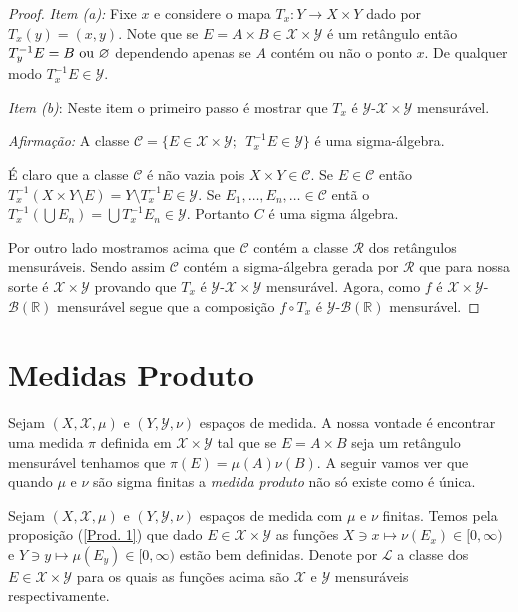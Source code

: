 \begin{proof}
 \emph{Item (a):} Fixe $x$ e considere o mapa $T_x:Y\to X\times Y$ dado por $T_x(y)=(x,y)$.
 Note que se $E=A\times B\in \mathscr{X}\times \mathscr{Y}$
é um retângulo então $T_{y}^{-1}E=B~\textnormal{ou}~\varnothing$ 
dependendo apenas se 
$A$ contém ou não o ponto $x$.  De qualquer modo $T_x^{-1}E\in \mathscr{Y}$.
\medskip

\noindent \emph{Item (b)}:  Neste item o primeiro passo é  mostrar 
que $T_x$ é $\mathscr{Y}$-$\mathscr{X}\times \mathscr{Y}$ 
mensurável. 
\medskip

\noindent \emph{Afirmação:} A classe
 $\mathcal{C}=\{E\in \mathscr{X}\times \mathscr{Y};~~T_x^{-1}E\in \mathscr{Y} \}$ 
 é uma sigma-álgebra.
\medskip 
 
\noindent É claro que a classe  $\mathcal{C}$ é
 não vazia pois $X\times Y\in \mathcal{C}$. 
 Se $E\in \mathcal{C}$ então 
$T_x^{-1}(X\times Y\setminus E)=Y\setminus T_x^{-1}E\in \mathscr{Y}.$  
Se $E_1, \ldots, E_n, \ldots \in \mathcal{C}$ entã
o $T_x^{-1}(\bigcup E_n)=\bigcup T_x^{-1}E_n\in \mathscr{Y}$. Portanto 
$C$ é uma sigma álgebra.
\medskip

Por outro lado mostramos acima que $\mathcal{C}$ contém a
 classe $\mathscr{R}$ dos retângulos mensuráveis. Sendo assim $\mathcal{C}$ contém a 
 sigma-álgebra gerada por $\mathscr{R}$ que para nossa sorte é $\mathscr{X}\times \mathscr{Y}$ 
 provando que $T_x$ é $\mathscr{Y}$-$\mathscr{X}\times \mathscr{Y}$ 
mensurável.  Agora, como $f$ é $\mathscr{X}\times \mathscr{Y}$-$\mathscr{B}(\mathbb{R})$ mensurável 
 segue que a composição $f\circ T_x$ é $\mathscr{Y}$-$\mathscr{B}(\mathbb{R})$ mensurável.

\end{proof}


\section{Medidas Produto}
Sejam $(X, \mathscr{X}, \mu)$ e $(Y, \mathscr{Y}, \nu)$
 espaços de medida. A nossa  vontade é encontrar uma medida $\pi$ definida 
 em $\mathscr{X}\times \mathscr{Y}$ tal que se $E=A\times B$ seja um retângulo mensurável 
 tenhamos que $\pi(E)=\mu(A)\nu(B)$. A seguir vamos ver que quando 
 $ \mu$ e $\nu$ são sigma finitas a \emph{medida produto} não só existe como é única.
 \medskip
 

Sejam $(X, \mathscr{X}, \mu)$ e $(Y, \mathscr{Y}, \nu)$
 espaços de medida com $\mu$ e $\nu$ finitas. 
 Temos pela proposição (\ref{Prod. 1}) que dado
  $E\in \mathscr{X}\times \mathscr{Y}$ as funções 
  $X\ni x\mapsto \nu(E_x)\in [0, \infty)$ e
   $Y\ni y\mapsto \mu(E_y)\in [0, \infty)$ estão bem definidas.
Denote por $\mathscr{L}$ a classe dos $E\in \mathscr{X}\times \mathscr{Y}$
para os quais as funções acima são $\mathscr{X}$ e $\mathscr{Y}$ mensuráveis 
respectivamente.

